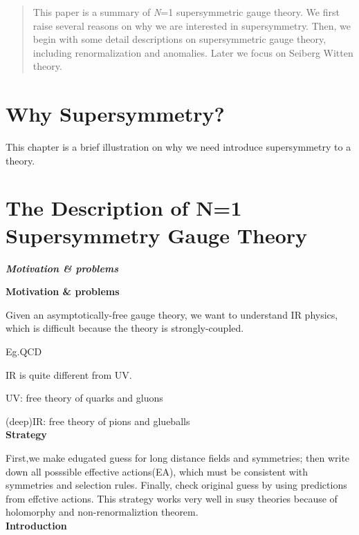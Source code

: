 \documentclass[type = bachelor]{fduthesis-en}
\begin{document}
  \tableofcontents
  \begin{abstract}
	  This paper is a summary of \textit{N}=1 supersymmetric 
	  gauge theory. We first raise several reasons on why we 
	  are interested in supersymmetry. Then, we begin with 
	  some detail descriptions on supersymmetric gauge theory, 
	  including renormalization and anomalies. Later we focus 
	  on Seiberg Witten theory. 
   \end{abstract}
   
\chapter{Why Supersymmetry?}
	  This chapter is a brief illustration on why we need introduce 
	  supersymmetry to a theory. 
	
\chapter{The Description of N=1 Supersymmetry Gauge Theory}

\noindent\textbf{\emph{Motivation \& problems}}

\noindent\textbf{Motivation \& problems}

Given an asymptotically-free gauge theory, we want to understand IR physics, which is difficult because the theory is strongly-coupled.\\


Eg.QCD

IR is quite different from UV.

UV: free theory of quarks and gluons

(deep)IR: free theory of pions and glueballs
\bigskip\\
\textbf{Strategy}

First,we make edugated guess for  long distance fields and symmetries; then write down all posssible effective actions(EA), which must be consistent with symmetries and selection rules. Finally, check original guess by using predictions from effctive actions. This strategy works very well in susy theories because of holomorphy and non-renormaliztion theorem.
\bigskip\\
\textbf{Introduction}
\end{document}
